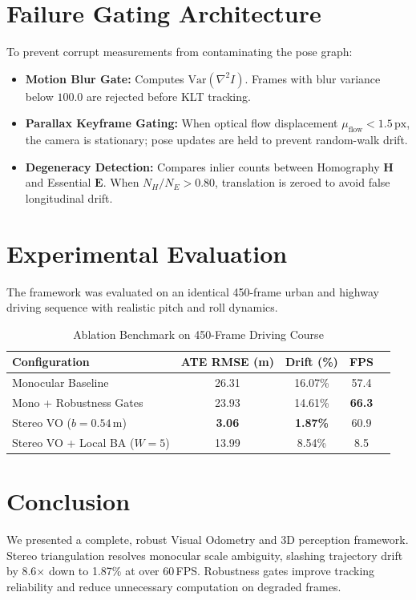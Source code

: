 \documentclass[conference]{IEEEtran}
\begin{document}
\section{Failure Gating Architecture}
To prevent corrupt measurements from contaminating the pose graph:
\begin{itemize}
    \item \textbf{Motion Blur Gate:} Computes $\text{Var}(\nabla^2 I)$. Frames with blur variance below $100.0$ are rejected before KLT tracking.
    \item \textbf{Parallax Keyframe Gating:} When optical flow displacement $\mu_{\text{flow}} < 1.5\,\text{px}$, the camera is stationary; pose updates are held to prevent random-walk drift.
    \item \textbf{Degeneracy Detection:} Compares inlier counts between Homography $\mathbf{H}$ and Essential $\mathbf{E}$. When $N_H / N_E > 0.80$, translation is zeroed to avoid false longitudinal drift.
\end{itemize}

\section{Experimental Evaluation}
The framework was evaluated on an identical 450-frame urban and highway driving sequence with realistic pitch and roll dynamics.

\begin{table}[htbp]
\caption{Ablation Benchmark on 450-Frame Driving Course}
\begin{center}
\begin{tabular}{lcccc}
\toprule
\textbf{Configuration} & \textbf{ATE RMSE (m)} & \textbf{Drift (\%)} & \textbf{FPS} \\
\midrule
Monocular Baseline & 26.31 & 16.07\% & 57.4 \\
Mono + Robustness Gates & 23.93 & 14.61\% & \textbf{66.3} \\
Stereo VO ($b=0.54\,\text{m}$) & \textbf{3.06} & \textbf{1.87\%} & 60.9 \\
Stereo VO + Local BA ($W=5$) & 13.99 & 8.54\% & 8.5 \\
\bottomrule
\end{tabular}
\label{tab:ablation}
\end{center}
\end{table}

\section{Conclusion}
We presented a complete, robust Visual Odometry and 3D perception framework. Stereo triangulation resolves monocular scale ambiguity, slashing trajectory drift by 8.6$\times$ down to 1.87\% at over 60\,FPS. Robustness gates improve tracking reliability and reduce unnecessary computation on degraded frames.
\end{document}
